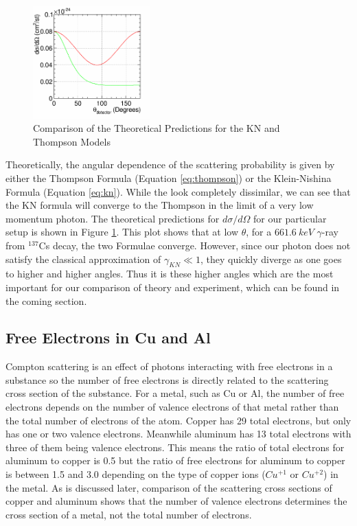 \documentclass[%
 reprint,
 amsmath,amssymb,
 aps,
 pra,
]{revtex4-1}
\begin{document}
\begin{figure}[H]
	\centering
	\includegraphics[width=0.4\textwidth]{KNvsThompson_TheoryOnly.png}
	\caption{Comparison of the Theoretical Predictions for the KN and Thompson Models}
	\label{KN_vs_Thompson_Theory}
\end{figure}

Theoretically, the angular dependence of the scattering probability is given by either the Thompson Formula (Equation \ref{eq:thompson}) or the Klein-Nishina Formula (Equation \ref{eq:kn}). While the look completely dissimilar, we can see that the KN formula will converge to the Thompson in the limit of a very low momentum photon. The theoretical predictions for $d\sigma / d\Omega$ for our particular setup is shown in Figure \ref{KN_vs_Thompson_Theory}. This plot shows that at low $\theta$, for a $661.6~keV$ $\gamma$-ray from $^{137}$Cs decay, the two Formulae converge. However, since our photon does not satisfy the classical approximation of $\gamma_{KN} \ll 1$, they quickly diverge as one goes to higher and higher angles. Thus it is these higher angles which are the most important for our comparison of theory and experiment, which can be found in the coming section.

\subsection{Free Electrons in Cu and Al}
Compton scattering is an effect of photons interacting with free electrons in a substance so the number of free electrons is directly related to the scattering cross section of the substance. For a metal, such as Cu or Al, the number of free electrons depends on the number of valence electrons of that metal rather than the total number of electrons of the atom. Copper has 29 total electrons, but only has one or two valence electrons. Meanwhile aluminum has 13 total electrons with three of them being valence electrons. This means the ratio of total electrons for aluminum to copper is 0.5 but the ratio of free electrons for aluminum to copper is between 1.5 and 3.0 depending on the type of copper ions ($Cu^{+1}$ or $Cu^{+2}$) in the metal. As is discussed later, comparison of the scattering cross sections of copper and aluminum shows that the number of valence electrons determines the cross section of a metal, not the total number of electrons.
\end{document}
